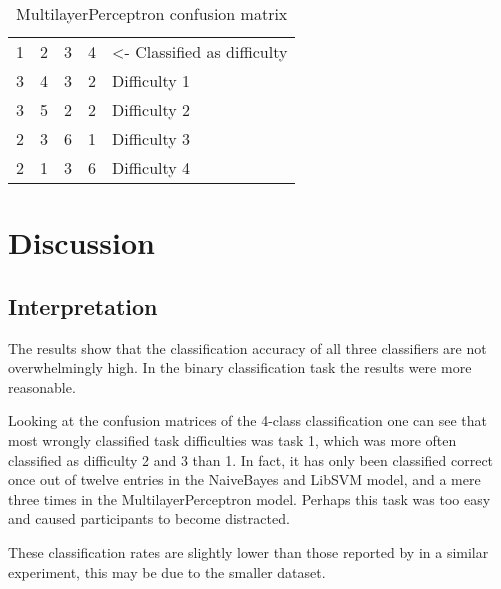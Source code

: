 \documentclass[11pt,leqno,letterpaper]{report} %
\begin{document}

\begin{table}[h]
\caption {MultilayerPerceptron confusion matrix} 
\center
\begin{tabular}{ccccl}
\multicolumn{1}{l}{1} & \multicolumn{1}{l}{2} & \multicolumn{1}{l}{3} & \multicolumn{1}{l}{4} & \small{\textless- Classified as difficulty} \\ \cline{1-4}
3                          & 4                          & 3                          & \multicolumn{1}{c|}{2}     & Difficulty 1                    \\
3                          & 5                          & 2                          & \multicolumn{1}{c|}{2}     & Difficulty 2                    \\
2                          & 3                          & 6                          & \multicolumn{1}{c|}{1}     & Difficulty 3                    \\
2                          & 1                          & 3                          & \multicolumn{1}{c|}{6}     & Difficulty 4                   
\end{tabular}
\end{table}







\chapter{Discussion}
\section{Interpretation}
The results show that the classification accuracy of all three classifiers are not overwhelmingly high. In the binary classification task the results were more reasonable.

Looking at the confusion matrices of the 4-class classification one can see that most wrongly classified task difficulties was task 1, which was more often classified as difficulty 2 and 3 than 1. In fact, it has only been classified correct once out of twelve entries in the NaiveBayes and LibSVM model, and a mere three times in the MultilayerPerceptron model. Perhaps this task was too easy and caused participants to become distracted.

These classification rates are slightly lower than those reported by \citep{Nourbakhsh2013} in a similar experiment, this may be due to the smaller dataset.
\end{document}
